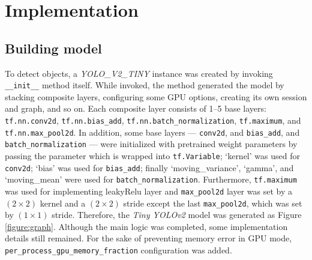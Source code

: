 \documentclass[a4paper,12pt]{article}
\begin{document}
\section{Implementation}


\subsection{Building model}

To detect objects, a \emph{YOLO\_V2\_TINY} instance was created by invoking \lstinline{__init__} method itself. 
While invoked, the method generated the model by stacking composite layers, configuring some GPU options, creating its own session and graph, and so on. 
Each composite layer consists of 1--5 base layers: \lstinline{tf.nn.conv2d}, \lstinline{tf.nn.bias_add}, \lstinline{tf.nn.batch_normalization}, \lstinline{tf.maximum}, and \lstinline{tf.nn.max_pool2d}.
In addition, some base layers --- \lstinline{conv2d}, and \lstinline{bias_add}, and \lstinline{batch_normalization} --- were initialized with pretrained weight parameters by passing the parameter which is wrapped into \lstinline{tf.Variable};
‘kernel’ was used for \lstinline{conv2d}; 
‘bias’ was used for \lstinline{bias_add};
finally ‘moving\_variance’, ‘gamma’, and ‘moving\_mean’ were used for \lstinline{batch_normalization}. Furthermore, \lstinline{tf.maximum} was used for implementing leakyRelu layer and \lstinline{max_pool2d} layer was set by a $(2 \times 2)$ kernel and a $(2 \times 2)$ stride except the last \lstinline{max_pool2d}, which was set by $(1 \times 1)$ stride. Therefore, the \emph{Tiny YOLOv2} model was generated as Figure \ref{figure:graph}.
Although the main logic was completed, some implementation details still remained. For the sake of preventing memory error in GPU mode, \lstinline{per_process_gpu_memory_fraction} configuration was added.
\end{document}
